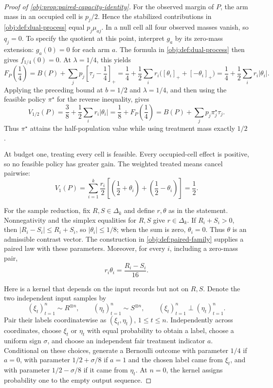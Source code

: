 \begin{proof}[Proof of \cref{obj:prop:paired-capacity-identity}]
For the observed margin of \(P\), the arm mass in an occupied cell is \(p_j/2\). Hence the stabilized contributions in \cref{obj:def:dual-process} equal \(p_j\mu_{aj}\). In a null cell all four observed masses vanish, so \(q_j=0\). To specify the quotient at this point, interpret \(g_a\) by its zero-mass extension: \(g_a(0)=0\) for each arm \(a\). The formula in \cref{obj:def:dual-process} then gives \(f_{1/4}(0)=0\). At \(\lambda=1/4\), this yields
\[
F_P\!\left(\frac14\right)
=B(P)+\sum_jp_j\left[\tau_j-\frac14\right]_+
=\frac14+\frac12\sum_i r_i
 \bigl([\theta_i]_++[-\theta_i]_+\bigr)
=\frac14+\frac12\sum_i r_i|\theta_i|.
\] %
Applying the preceding bound at \(b=1/2\) and \(\lambda=1/4\), and then using the feasible policy \(\pi^\star\) for the reverse inequality, gives
\[
V_{1/2}(P)
=\frac38+\frac12\sum_i r_i|\theta_i|
=\frac18+F_P\!\left(\frac14\right)
=B(P)+\sum_jp_j\pi^\star_j\tau_j.
\] %
Thus \(\pi^\star\) attains the half-population value while using treatment mass exactly \(1/2\).

At budget one, treating every cell is feasible. Every occupied-cell effect is positive, so no feasible policy has greater gain. The weighted treated means cancel pairwise:
\[
V_1(P)
=\sum_{i=1}^k\frac{r_i}{2}
 \left[\left(\frac12+\theta_i\right)
       +\left(\frac12-\theta_i\right)\right]
=\frac12.
\] %

For the sample reduction, fix \(R,S\in\Delta_k\) and define \(r,\theta\) as in the statement. Nonnegativity and the simplex equalities for \(R,S\) give \(r\in\Delta_k\). If \(R_i+S_i>0\), then \(|R_i-S_i|\leq R_i+S_i\), so \(|\theta_i|\leq1/8\); when the sum is zero, \(\theta_i=0\). Thus \(\theta\) is an admissible contrast vector. The construction in \cref{obj:def:paired-family} supplies a paired law with these parameters. Moreover, for every \(i\), including a zero-mass pair,
\[
r_i\theta_i=\frac{R_i-S_i}{16}.
\] %

Here is a kernel that depends on the input records but not on \(R,S\). Denote the two independent input samples by
\[
(\xi_t)_{t=1}^n\sim R^{\otimes n},\qquad
(\eta_t)_{t=1}^n\sim S^{\otimes n},\qquad
(\xi_t)_{t=1}^n\perp(\eta_t)_{t=1}^n.
\]
Pair their labels coordinatewise as \((\xi_t,\eta_t)\), \(1\leq t\leq n\). Independently across coordinates, choose \(\xi_t\) or \(\eta_t\) with equal probability to obtain a label, choose a uniform sign \(\sigma\), and choose an independent fair treatment indicator \(a\). Conditional on these choices, generate a Bernoulli outcome with parameter \(1/4\) if \(a=0\), with parameter \(1/2+\sigma/8\) if \(a=1\) and the chosen label came from \(\xi_t\), and with parameter \(1/2-\sigma/8\) if it came from \(\eta_t\). At \(n=0\), the kernel assigns probability one to the empty output sequence.


\end{proof}

